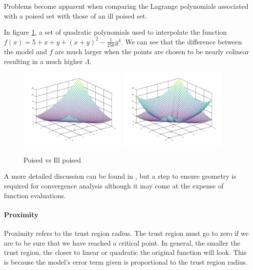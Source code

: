 Problems become apparent when comparing the Lagrange polynomials associated with a poised set with those of an ill poised set.

In figure \ref{pvip}, a set of quadratic polynomials used to interpolate the function $f(x) = 5 + x + y + (x + y) ^ 2 - \frac 1 {250} y ^ 4$.
We can see that the difference between the model and $f$ are much larger when the points are chosen to be nearly colinear resulting in a much higher $\Lambda$.

\begin{figure}[h]
    \centering
    \includegraphics[width=200px]{images/poised_good.png}
    \includegraphics[width=200px]{images/poised_bad.png}
    \caption{Poised vs Ill poised}
    \label{pvip}
\end{figure}


\begin{center}

\end{center}

A more detailed discussion can be found in \cite{doi:10.1080/10556780802409296}, but a step to ensure geometry is required for convergence analysis although it may come at the expense of function evaluations.

\paragraph{Proximity}

Proximity refers to the trust region radius.
The trust region must go to zero if we are to be sure that we have reached a critical point.
In general, the smaller the trust region, the closer to linear or quadratic the original function will look.
This is because the model's error term given is proportional to the trust region radius.

